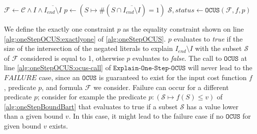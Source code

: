 \documentclass[twoside,11pt]{article}
\newcommand\m[1]{\mathcal{#1}}
\newcommand\comment[1]{\marginpar{\tiny #1}}
\renewcommand\comment[1]{#1}
\newcommand{\tias}[1]{{\comment{\color{blue}Tias:#1}}}
\newcommand{\emilio}[1]{{\comment{\color{red}Emilio: #1}}}
\newcommand{\bart}[1]{{\comment{\color{OliveGreen}Bart: #1}}}
\newcommand\Iend{\ensuremath{I_\mathit{end} }\xspace}
\newcommand\formula{\ensuremath{\m{F} }\xspace}
\newcommand\formulac{\ensuremath{\m{C} }\xspace}
\newcommand\mm[1]{\ensuremath{#1}\xspace}
\newcommand\call[1]{\mm{\texttt{#1}}}
\newcommand\comus{\mm{\call{OCUS}}}
\newcommand\onestepo{\ensuremath{\call{Explain-One-Step-OCUS}}\xspace}
\begin{document}
\begin{algorithm}[!h]
	\DontPrintSemicolon
	
	\caption{$\onestepo(\formulac,f,I,\Iend)$}
	\label{alg:oneStepOCUS}
$\formula \gets \formulac\land I\land \overline{\Iend\setminus I}$\;
$p \gets (S\mapsto \# (S\cap \overline{\Iend\setminus  I})=1)$\label{alg:oneStepOCUS:exactlyone}\;
$\m{S} , \mathit{status} \gets \call{OCUS}(\formula, f, p)$\label{alg:oneStepOCUS:ocus-call}\;
\lIf{$\mathit{status} \neq \mathit{FAILURE}$}{\Return{$\m{S}$} }
\lElse{\Return{$\emptyset$}}
\end{algorithm}

We define the exactly one constraint $p$ as the equality constraint shown on line \ref{alg:oneStepOCUS:exactlyone} of \cref{alg:oneStepOCUS}. $p$ evaluates to \textit{true} if the size of the intersection of the negated literals to explain $\Iend\setminus I$ with the subset $\m{S}$ of $\formula$ considered is equal to 1, otherwise $p$ evaluates to \textit{false}. 
The call to \comus at line \ref{alg:oneStepOCUS:ocus-call} of \onestepo will never lead to the $\mathit{FAILURE}$ case, since an \comus is guaranteed to exist for the input cost function $f$, predicate $p$, and formula $\formula$ we consider. Failure can occur for a different predicate $p$; consider for example the predicate $p: (\m{S} \mapsto f(S) \leq v)$ of \cref{alg:oneStepBoundBart} that evaluates to true if a subset $\m{S}$ has a value lower than a given bound $v$. In this case, it might lead to the failure case if no \comus for given bound $v$ exists.  
\end{document}
